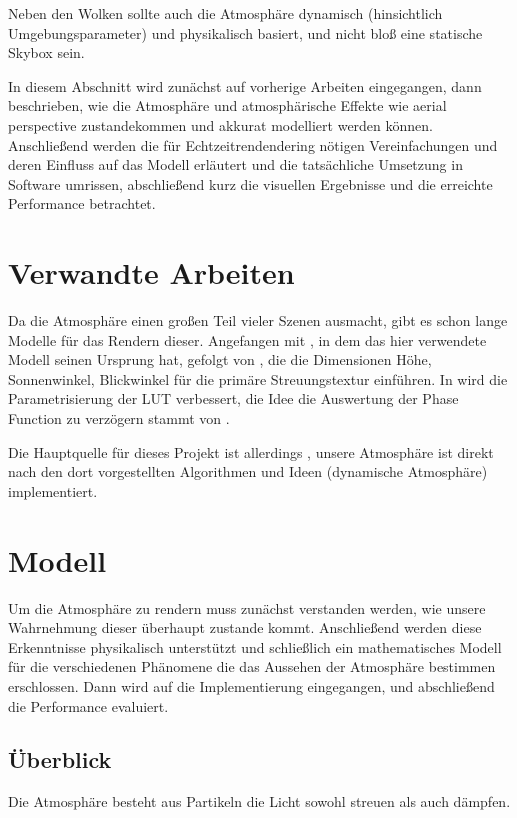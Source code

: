 Neben den Wolken sollte auch die Atmosphäre dynamisch (hinsichtlich Umgebungsparameter) und physikalisch basiert, und
nicht bloß eine statische Skybox sein.

In diesem Abschnitt wird zunächst auf vorherige Arbeiten eingegangen, dann beschrieben, wie die Atmosphäre und
atmosphärische Effekte wie aerial perspective zustandekommen und akkurat modelliert werden können. Anschließend
werden die für Echtzeitrendendering nötigen Vereinfachungen und deren Einfluss auf das Modell erläutert und
die tatsächliche Umsetzung in Software umrissen, abschließend kurz die visuellen Ergebnisse und die erreichte
Performance betrachtet.

\section{Verwandte Arbeiten}
Da die Atmosphäre einen großen Teil vieler Szenen ausmacht, gibt es schon lange Modelle für das Rendern dieser.
Angefangen mit \cite{Nishita93}, in dem das hier verwendete Modell seinen Ursprung hat, gefolgt von
\cite{Schafhitzel07}, die die Dimensionen Höhe, Sonnenwinkel, Blickwinkel für die primäre Streuungstextur einführen.
In \cite{Bruneton08} wird die Parametrisierung der LUT verbessert, die Idee die Auswertung der Phase Function zu
verzögern stammt von \cite{Elek09}.

Die Hauptquelle für dieses Projekt ist allerdings \cite{Bodare14}, unsere Atmosphäre ist direkt nach den dort
vorgestellten Algorithmen und Ideen (dynamische Atmosphäre) implementiert.

\section{Modell}

Um die Atmosphäre zu rendern muss zunächst verstanden werden, wie unsere Wahrnehmung dieser überhaupt zustande kommt.
Anschließend werden diese Erkenntnisse physikalisch unterstützt und schließlich ein mathematisches Modell für die
verschiedenen Phänomene die das Aussehen der Atmosphäre bestimmen erschlossen. Dann wird auf die Implementierung
eingegangen, und abschließend die Performance evaluiert.

\subsection{Überblick}
Die Atmosphäre besteht aus Partikeln die Licht sowohl streuen als auch dämpfen.


